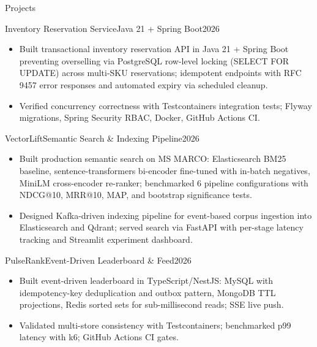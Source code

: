 \documentclass[]{mcdowellcv}
\begin{document}
\begin{cvsection}{Projects}
  \begin{cvsubsection}{Inventory Reservation Service}{Java 21 + Spring Boot}{2026}
    \begin{itemize}
      \item Built transactional inventory reservation API in Java 21 + Spring Boot preventing overselling via PostgreSQL row-level locking (SELECT FOR UPDATE) across multi-SKU reservations; idempotent endpoints with RFC 9457 error responses and automated expiry via scheduled cleanup.
      \item Verified concurrency correctness with Testcontainers integration tests; Flyway migrations, Spring Security RBAC, Docker, GitHub Actions CI.
    \end{itemize}
    \vspace{-1.5pt}
  \end{cvsubsection}

  \begin{cvsubsection}{VectorLift}{Semantic Search \& Indexing Pipeline}{2026}
    \begin{itemize}
      \item Built production semantic search on MS MARCO: Elasticsearch BM25 baseline, sentence-transformers bi-encoder fine-tuned with in-batch negatives, MiniLM cross-encoder re-ranker; benchmarked 6 pipeline configurations with NDCG@10, MRR@10, MAP, and bootstrap significance tests.
      \item Designed Kafka-driven indexing pipeline for event-based corpus ingestion into Elasticsearch and Qdrant; served search via FastAPI with per-stage latency tracking and Streamlit experiment dashboard.
    \end{itemize}
    \vspace{-1.5pt}
  \end{cvsubsection}

  \begin{cvsubsection}{PulseRank}{Event-Driven Leaderboard \& Feed}{2026}
    \begin{itemize}
      \item Built event-driven leaderboard in TypeScript/NestJS: MySQL with idempotency-key deduplication and outbox pattern, MongoDB TTL projections, Redis sorted sets for sub-millisecond reads; SSE live push.
      \item Validated multi-store consistency with Testcontainers; benchmarked p99 latency with k6; GitHub Actions CI gates.
    \end{itemize}
  \end{cvsubsection}
\end{cvsection}
\end{document}
